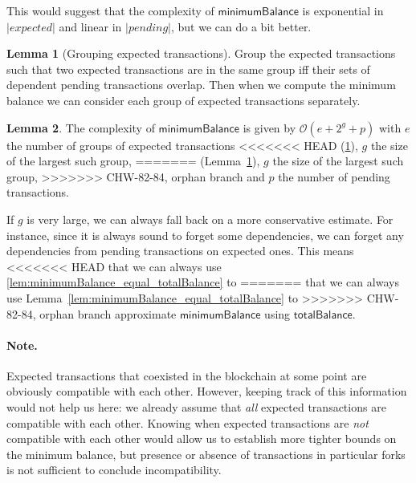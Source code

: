 \documentclass{article}
\newcommand{\order}[1]{\mathcal{O}\left(#1\right)}
\theoremstyle{definition}{
  \newtheorem{lemma}{Lemma}[section] %
  \newtheorem{definition}[lemma]{Definition}
}
\theoremstyle{theorem}{
  \newtheorem{invariant}[lemma]{Invariant}
  \newtheorem{proofobligation}[lemma]{Proof Obligation}
}
\newtheorem{lemma}{Lemma}[section] %
\numberwithin{equation}{lemma}
\begin{document}
This would suggest that the complexity of $\mathsf{minimumBalance}$ is
exponential in $|\mathit{expected}|$ and linear in $|\mathit{pending}|$,
but we can do a bit better.

\begin{lemma}[Grouping expected transactions]
Group the expected transactions such that two expected transactions are in
the same group iff their sets of dependent pending transactions overlap.
Then when we compute the minimum balance we can consider each group of
expected transactions separately.
\label{lem:group_expected}
\end{lemma}

\begin{lemma}
The complexity of $\mathsf{minimumBalance}$ is given by
\begin{math}
\order{e + 2^g + p}
\end{math}
with $e$ the number of groups of expected transactions
<<<<<<< HEAD
(\cref{lem:group_expected}), $g$ the size of the largest such group,
=======
(Lemma~\ref{lem:group_expected}), $g$ the size of the largest such group,
>>>>>>> CHW-82-84, orphan branch
and $p$ the number of pending transactions.
\label{lem:complexity_minimize}
\end{lemma}

If $g$ is very large, we can always fall back on a more conservative estimate.
For instance, since it is always sound to forget some dependencies, we can
forget any dependencies from pending transactions on expected ones. This means
<<<<<<< HEAD
that we can always use \cref{lem:minimumBalance_equal_totalBalance} to
=======
that we can always use Lemma~\ref{lem:minimumBalance_equal_totalBalance} to
>>>>>>> CHW-82-84, orphan branch
approximate $\mathsf{minimumBalance}$ using $\mathsf{totalBalance}$.

\paragraph{Note.}
Expected transactions that coexisted in the blockchain at some point are
obviously compatible with each other. However, keeping track of this information
would not help us here: we already assume that \emph{all} expected transactions
are compatible with each other. Knowing when expected transactions are
\emph{not} compatible with each other would allow us to establish more tighter
bounds on the minimum balance, but presence or absence of transactions in
particular forks is not sufficient to conclude incompatibility.
\end{document}
